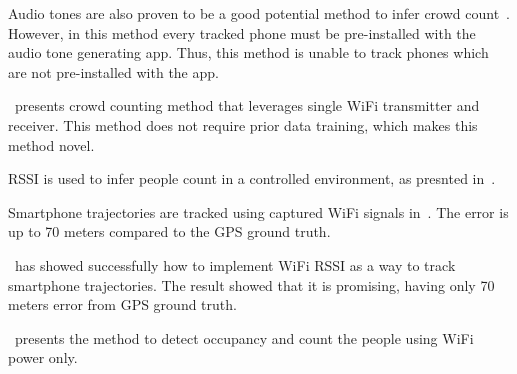 Audio tones are also proven to be a good potential method to infer crowd count~\cite{thesis044}. However, in this method every tracked phone must be pre-installed with the audio tone generating app. Thus, this method is unable to track phones which are not pre-installed with the app.

\cite{thesis051}~presents crowd counting method that leverages single WiFi transmitter and receiver. This method does not require prior data training, which makes this method novel.

RSSI is used to infer people count in a controlled environment, as presnted in~\cite{thesis052}. 

Smartphone trajectories are tracked using captured WiFi signals in~\cite{thesis058}. The error is up to 70 meters compared to the GPS ground truth.

\cite{thesis048}~has showed successfully how to implement WiFi RSSI as a way to track smartphone trajectories. The result showed that it is promising, having only 70 meters error from GPS ground truth.

\cite{thesis046}~presents the method to detect occupancy and count the people using WiFi power only.



